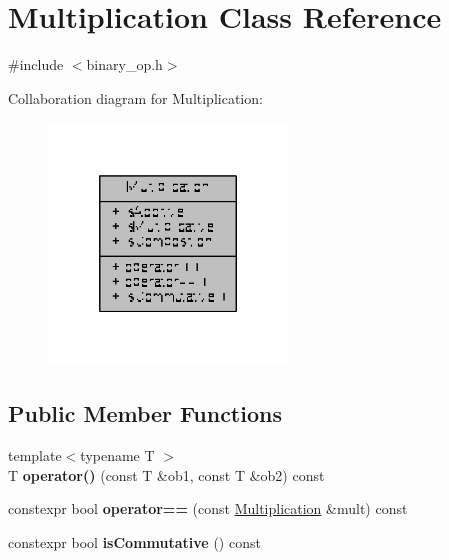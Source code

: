 \hypertarget{classMultiplication}{\section{Multiplication Class Reference}
\label{classMultiplication}
}


{\ttfamily \#include $<$binary\-\_\-op.\-h$>$}



Collaboration diagram for Multiplication\-:
\nopagebreak
\begin{figure}[H]
\begin{center}
\leavevmode
\includegraphics[width=180pt]{classMultiplication__coll__graph}
\end{center}
\end{figure}
\subsection*{Public Member Functions}
\begin{DoxyCompactItemize}
\item 
\hypertarget{classMultiplication_abc832d7341a7f4a33054e41b8a6883da}{{\footnotesize template$<$typename T $>$ }\\T {\bfseries operator()} (const T \&ob1, const T \&ob2) const }\label{classMultiplication_abc832d7341a7f4a33054e41b8a6883da}

\item 
\hypertarget{classMultiplication_a955cde82478d372b4728f01fad965c23}{constexpr bool {\bfseries operator==} (const \hyperlink{classMultiplication}{Multiplication} \&mult) const }\label{classMultiplication_a955cde82478d372b4728f01fad965c23}

\item 
\hypertarget{classMultiplication_a48b06f69d49696548c11cbf1d3c6bcf6}{constexpr bool {\bfseries is\-Commutative} () const }\label{classMultiplication_a48b06f69d49696548c11cbf1d3c6bcf6}

\end{DoxyCompactItemize}
